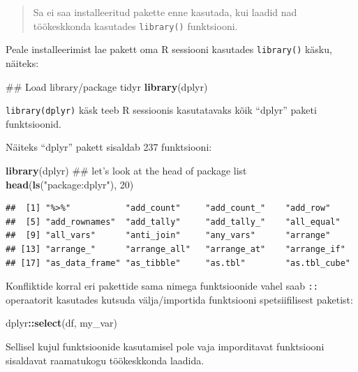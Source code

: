\documentclass[]{book}
\newenvironment{Shaded}{\begin{snugshade}}{\end{snugshade}}
\newcommand{\KeywordTok}[1]{\textcolor[rgb]{0.13,0.29,0.53}{\textbf{#1}}}
\newcommand{\DecValTok}[1]{\textcolor[rgb]{0.00,0.00,0.81}{#1}}
\newcommand{\StringTok}[1]{\textcolor[rgb]{0.31,0.60,0.02}{#1}}
\newcommand{\OperatorTok}[1]{\textcolor[rgb]{0.81,0.36,0.00}{\textbf{#1}}}
\newcommand{\NormalTok}[1]{#1}
\begin{document}
\begin{quote}
Sa ei saa installeeritud pakette enne kasutada, kui laadid nad
töökeskkonda kasutades \texttt{library()} funktsiooni.
\end{quote}

Peale installeerimist lae pakett oma R sessiooni kasutades
\texttt{library()} käsku, näiteks:

\begin{Shaded}
\begin{Highlighting}[]
\NormalTok{## Load library/package tidyr}
\KeywordTok{library}\NormalTok{(dplyr)}
\end{Highlighting}
\end{Shaded}

\texttt{library(dplyr)} käsk teeb R sessioonis kasutatavaks kõik
``dplyr'' paketi funktsioonid.

Näiteks ``dplyr'' pakett sisaldab 237 funktsiooni:

\begin{Shaded}
\begin{Highlighting}[]
\KeywordTok{library}\NormalTok{(dplyr)}
\NormalTok{## let's look at the head of package list}
\KeywordTok{head}\NormalTok{(}\KeywordTok{ls}\NormalTok{(}\StringTok{"package:dplyr"}\NormalTok{), }\DecValTok{20}\NormalTok{)}
\end{Highlighting}
\end{Shaded}

\begin{verbatim}
##  [1] "%>%"           "add_count"     "add_count_"    "add_row"      
##  [5] "add_rownames"  "add_tally"     "add_tally_"    "all_equal"    
##  [9] "all_vars"      "anti_join"     "any_vars"      "arrange"      
## [13] "arrange_"      "arrange_all"   "arrange_at"    "arrange_if"   
## [17] "as_data_frame" "as_tibble"     "as.tbl"        "as.tbl_cube"
\end{verbatim}

Konfliktide korral eri pakettide sama nimega funktsioonide vahel saab
\texttt{::} operaatorit kasutades kutsuda välja/importida funktsiooni
spetsiifilisest paketist:

\begin{Shaded}
\begin{Highlighting}[]
\NormalTok{dplyr}\OperatorTok{::}\KeywordTok{select}\NormalTok{(df, my_var)}
\end{Highlighting}
\end{Shaded}

Sellisel kujul funktsioonide kasutamisel pole vaja imporditavat
funktsiooni sisaldavat raamatukogu töökeskkonda laadida.
\end{document}
